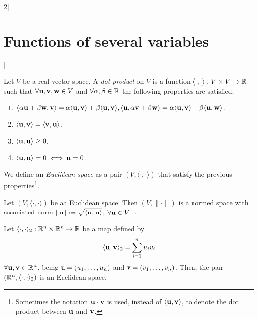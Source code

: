 \documentclass[../../../main.tex]{subfiles}
\begin{document}
\begin{multicols}{2}[\section{Functions of several variables}]
\begin{prop}
    \end{prop}
    \begin{definition}
        Let $V$ be a real vector space. A \textit{dot product} on $V$ is a function $\langle\cdot,\cdot\rangle:V\times V\rightarrow\mathbb{R} $ such that $\forall \boldsymbol{\mathrm{u}},\boldsymbol{\mathrm{v}},\boldsymbol{\mathrm{w}}\in V$ and $\forall\alpha,\beta\in\mathbb{R} $ the following properties are satisfied:
        \begin{enumerate}
            \item $\langle \alpha \boldsymbol{\mathrm{u}}+\beta \boldsymbol{\mathrm{w}},\boldsymbol{\mathrm{v}}\rangle=\alpha\langle \boldsymbol{\mathrm{u}},\boldsymbol{\mathrm{v}}\rangle+\beta\langle \boldsymbol{\mathrm{u}},\boldsymbol{\mathrm{v}}\rangle,\\\langle \boldsymbol{\mathrm{u}},\alpha \boldsymbol{\mathrm{v}}+\beta \boldsymbol{\mathrm{w}}\rangle=\alpha\langle \boldsymbol{\mathrm{u}},\boldsymbol{\mathrm{v}}\rangle+\beta\langle \boldsymbol{\mathrm{u}},\boldsymbol{\mathrm{w}}\rangle$.
            \item $\langle \boldsymbol{\mathrm{u}},\boldsymbol{\mathrm{v}}\rangle=\langle \boldsymbol{\mathrm{v}},\boldsymbol{\mathrm{u}}\rangle$.
            \item $\langle \boldsymbol{\mathrm{u}},\boldsymbol{\mathrm{u}}\rangle\geq 0$.
            \item $\langle \boldsymbol{\mathrm{u}},\boldsymbol{\mathrm{u}}\rangle=0\iff \boldsymbol{\mathrm{u}}=0$.
        \end{enumerate}
        We define an \textit{Euclidean space} as a pair $(V,\langle\cdot,\cdot\rangle)$ that satisfy the previous properties\footnote{Sometimes the notation $\boldsymbol{\mathrm{u}}\cdot \boldsymbol{\mathrm{v}}$ is used, instead of $\langle \boldsymbol{\mathrm{u}},\boldsymbol{\mathrm{v}}\rangle$, to denote the dot product between $\boldsymbol{\mathrm{u}}$ and $\boldsymbol{\mathrm{v}}$.}.
    \end{definition}
    \begin{prop}
        Let $(V,\langle\cdot,\cdot\rangle)$ be an Euclidean space. Then $(V,\|\cdot\|)$ is a normed space with associated norm $\|\boldsymbol{\mathrm{u}}\|:=\sqrt{\langle \boldsymbol{\mathrm{u}},\boldsymbol{\mathrm{u}}\rangle}$, $\forall \boldsymbol{\mathrm{u}}\in V$. .
    \end{prop}
    \begin{prop}
        Let $\langle\cdot,\cdot\rangle_2:\mathbb{R}^n\times\mathbb{R}^n\rightarrow\mathbb{R} $ be a map defined by $$\langle \boldsymbol{\mathrm{u}},\boldsymbol{\mathrm{v}}\rangle_2=\sum_{i=1}^nu_iv_i$$ $\forall \boldsymbol{\mathrm{u}},\boldsymbol{\mathrm{v}}\in \mathbb{R}^n$, being $\boldsymbol{\mathrm{u}}=(u_1,\ldots,u_n)$ and $\boldsymbol{\mathrm{v}}=(v_1,\ldots,v_n)$. Then, the pair $(\mathbb{R}^n,\langle\cdot,\cdot\rangle_2)$ is an Euclidean space.

\end{prop}
\end{multicols}
\end{document}

